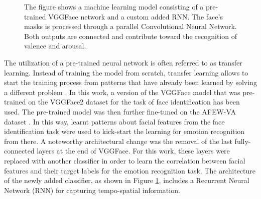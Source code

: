 \begin{figure}[htbp]
  \begin{center}
  \caption[ER pipeline step \#6: Machine learning model]{The figure shows a machine learning model consisting of a pre-trained VGGFace network and a custom added RNN. The face's masks is processed through a parallel Convolutional Neural Network. Both outputs are connected and contribute toward the recognition of valence and arousal.}
  \label{fig:MachineLearningModel}
  \end{center}
\end{figure}

\noindent The utilization of a pre-trained neural network is often referred to as transfer learning. Instead of training the model from scratch, transfer learning allows to start the training process from patterns that have already been learned by solving a different problem \citep{Pan:2010:SurveyOnTransferLearning}.
\newline\newline
In this work, a version of the VGGFace model that was pre-trained on the VGGFace2 dataset \citep{Cao:2018:VGGFace2} for the task of face identification has been used. The pre-trained model was then further fine-tuned on the AFEW-VA dataset \citep{Kossaifi:2017:AFEW-VADatabase}. In this way, learnt patterns about facial features from the face identification task were used to kick-start the learning for emotion recognition from there. 
\newline\newline
A noteworthy architectural change was the removal of the last fully-connected layers at the end of VGGFace. For this work, these layers were replaced with another classifier in order to learn the correlation between facial features and their target labels for the emotion recognition task. The architecture of the newly added classifier, as shown in Figure \ref{fig:MachineLearningModel}, includes a Recurrent Neural Network (RNN) for capturing tempo-spatial information.
